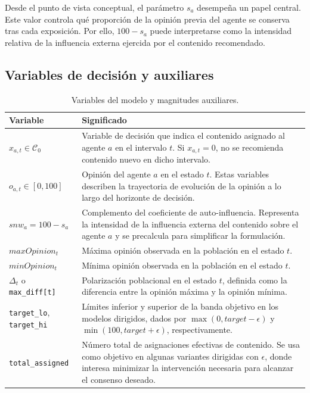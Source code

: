 \documentclass[10pt,letterpaper]{article}
\begin{document}
Desde el punto de vista conceptual, el par\'ametro \(s_a\) desempe\~na un papel central. Este valor controla qu\'e proporci\'on de la opini\'on previa del agente se conserva tras cada exposici\'on. Por ello, \(100-s_a\) puede interpretarse como la intensidad relativa de la influencia externa ejercida por el contenido recomendado.

\subsection{Variables de decisi\'on y auxiliares}

\begin{table}[H]
\centering
\caption{Variables del modelo y magnitudes auxiliares.}
\begin{tabularx}{\linewidth}{lY}
\toprule
\textbf{Variable} & \textbf{Significado} \\
\midrule
\(x_{a,t}\in\mathcal{C}_0\) & Variable de decisi\'on que indica el contenido asignado al agente \(a\) en el intervalo \(t\). Si \(x_{a,t}=0\), no se recomienda contenido nuevo en dicho intervalo. \\
\(o_{a,t}\in[0,100]\) & Opini\'on del agente \(a\) en el estado \(t\). Estas variables describen la trayectoria de evoluci\'on de la opini\'on a lo largo del horizonte de decisi\'on. \\
\(snw_a=100-s_a\) & Complemento del coeficiente de auto-influencia. Representa la intensidad de la influencia externa del contenido sobre el agente \(a\) y se precalcula para simplificar la formulaci\'on. \\
\(maxOpinion_t\) & M\'axima opini\'on observada en la poblaci\'on en el estado \(t\). \\
\(minOpinion_t\) & M\'inima opini\'on observada en la poblaci\'on en el estado \(t\). \\
\(\Delta_t\) o \texttt{max\_diff[t]} & Polarizaci\'on poblacional en el estado \(t\), definida como la diferencia entre la opini\'on m\'axima y la opini\'on m\'inima. \\
\texttt{target\_lo}, \texttt{target\_hi} & L\'imites inferior y superior de la banda objetivo en los modelos dirigidos, dados por \(\max(0,target-\epsilon)\) y \(\min(100,target+\epsilon)\), respectivamente. \\
\texttt{total\_assigned} & N\'umero total de asignaciones efectivas de contenido. Se usa como objetivo en algunas variantes dirigidas con \(\epsilon\), donde interesa minimizar la intervenci\'on necesaria para alcanzar el consenso deseado. \\
\bottomrule
\end{tabularx}
\end{table}
\end{document}
